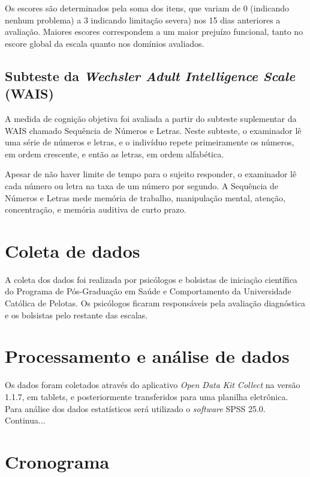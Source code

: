 \documentclass[chapter=TITLE,oneside,12pt,a4paper,english,brazil]{abntex2} %
\begin{document}
    Os escores são determinados pela soma dos itens, que variam de
    0 (indicando nenhum problema) a 3 indicando limitação severa)
    nos 15 dias anteriores a avaliação.
    Maiores escores correspondem a um maior prejuízo funcional,
    tanto no escore global da escala quanto nos domínios avaliados.

    \subsection{Subteste da \textit{Wechsler Adult Intelligence Scale} (WAIS)}\label{sec:wais}

    A medida de cognição objetiva foi avaliada a partir do subteste suplementar da WAIS
    chamado Sequência de Números e Letras. Neste subteste, o examinador lê uma série
    de números e letras, e o indivíduo repete primeiramente os números, em ordem
    crescente, e então as letras, em ordem alfabética.

    Apesar de não haver limite de tempo para o sujeito responder, o examinador lê
    cada número ou letra na taxa de um número por segundo. A Sequência de Números
    e Letras mede memória de trabalho, manipulação mental, atenção, concentração,
    e memória auditiva de curto prazo. \parencite{wechsler_wais_2004}

\section{Coleta de dados}\label{sec:coleta}

    A coleta dos dados foi realizada por psicólogos e bolsistas de iniciação
    científica do Programa de Pós-Graduação em Saúde e Comportamento da
    Universidade Católica de Pelotas.
    Os psicólogos ficaram responsáveis pela avaliação
    diagnóstica e os bolsistas pelo restante das escalas.

\section{Processamento e análise de dados}\label{sec:analise}

    Os dados foram coletados através do aplicativo \textit{Open Data Kit Collect}
    na versão 1.1.7, em tablets, e posteriormente transferidos para uma planilha
    eletrônica. Para análise dos dados estatísticos será utilizado o
    \textit{software} SPSS 25.0. Continua...

\section{Cronograma}\label{sec:cronograma}
\end{document}
